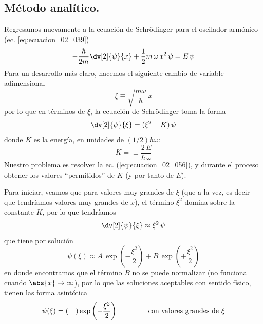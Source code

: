 \subsection{Método analítico.}
Regresamos nuevamente a la ecuación de Schrödinger para el oscilador armónico (ec. \ref{eq:ecuacion_02_039})
\begin{align*}
- \dfrac{\hbar}{2 m} \dv[2]{\psi}{x} + \dfrac{1}{2} m \, \omega \, x^{2} \, \psi = E \, \psi  
\end{align*}
Para un desarrollo más claro, hacemos el siguiente cambio de variable adimensional
\begin{equation}
\xi \equiv \sqrt{ \dfrac{m \omega}{\hbar}} \, x
\label{eq:ecuacion_02_055}
\end{equation}
por lo que en términos de $\xi$, la ecuación de Schrödinger toma la forma
\begin{equation}
\dv[2]{\psi}{\xi} = (\xi^{2} - K) \, \psi
\label{eq:ecuacion_02_056}
\end{equation}
donde $K$ es la energía, en unidades de $(1/2) \hbar \omega$:
\begin{equation}
K = \equiv \dfrac{2 \, E}{\hbar \, \omega}
\label{eq:ecuacion_02_057}
\end{equation}
Nuestro problema es resolver la ec. (\ref{eq:ecuacion_02_056}), y durante el proceso obtener los valores \enquote{permitidos} de $K$ (y por tanto de $E$).
\par
Para iniciar, veamos que para valores muy grandes de $\xi$ (que a la vez, es decir que tendríamos valores muy grandes de $x$), el término $\xi^{2}$ domina sobre la constante $K$, por lo que tendríamos
\begin{equation}
\dv[2]{\psi}{\xi} \approx \xi^{2} \, \psi
\label{eq:ecuacion_02_058}
\end{equation}
que tiene por solución
\begin{equation}
\psi (\xi) \approx A \, \exp \left( - \dfrac{\xi^{2}}{2} \right) + B \, \exp \left( + \dfrac{\xi^{2}}{2} \right)
\label{eq:ecuacion_02_059}
\end{equation}
en donde encontramos que el término $B$ no se puede normalizar (no funciona cuando $\abs{x} \to \infty$), por lo que las soluciones aceptables con sentido físico, tienen las forma asintótica
\begin{equation}
\psi (\xi) = ( \quad ) \exp \left( - \dfrac{\xi^{2}}{2} \right) \hspace{1.5cm} \text{con valores grandes de } \xi
\label{eq:ecuacion_02_060}
\end{equation}
